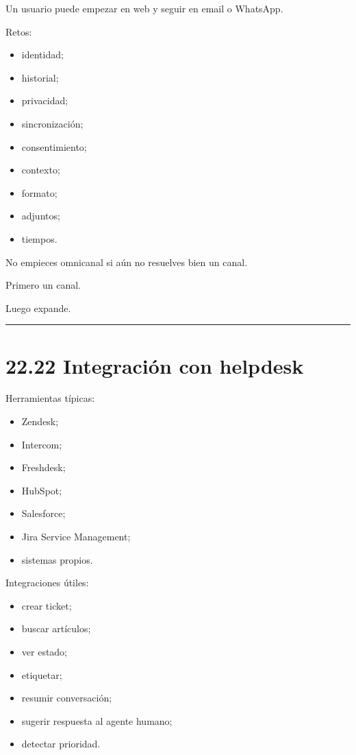 Un usuario puede empezar en web y seguir en email o WhatsApp.

Retos:

\begin{itemize}
\tightlist
\item
  identidad;
\item
  historial;
\item
  privacidad;
\item
  sincronización;
\item
  consentimiento;
\item
  contexto;
\item
  formato;
\item
  adjuntos;
\item
  tiempos.
\end{itemize}

No empieces omnicanal si aún no resuelves bien un canal.

Primero un canal.

Luego expande.

\begin{center}\rule{0.5\linewidth}{0.5pt}\end{center}

\section{22.22 Integración con
helpdesk}\label{integraciuxf3n-con-helpdesk}

Herramientas típicas:

\begin{itemize}
\tightlist
\item
  Zendesk;
\item
  Intercom;
\item
  Freshdesk;
\item
  HubSpot;
\item
  Salesforce;
\item
  Jira Service Management;
\item
  sistemas propios.
\end{itemize}

Integraciones útiles:

\begin{itemize}
\tightlist
\item
  crear ticket;
\item
  buscar artículos;
\item
  ver estado;
\item
  etiquetar;
\item
  resumir conversación;
\item
  sugerir respuesta al agente humano;
\item
  detectar prioridad.
\end{itemize}

